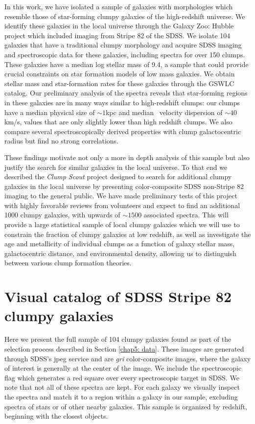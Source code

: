 In this work, we have isolated a sample of galaxies with morphologies which resemble those of star-forming clumpy galaxies of the high-redshift universe. We identify these galaxies in the local universe through the Galaxy Zoo: Hubble project which included imaging from Stripe 82 of the SDSS. We isolate 104 galaxies that have a traditional clumpy morphology and acquire SDSS imaging and spectroscopic data for these galaxies, including spectra for over 150 clumps. These galaxies have a median log stellar mass of 9.4, a sample that could provide crucial constraints on star formation models of low mass galaxies. We obtain stellar mass and star-formation rates for these galaxies through the GSWLC catalog. Our preliminary analysis of the spectra reveals that star-forming regions in these galaxies are in many ways similar to high-redshift clumps: our clumps have a median physical size of $\sim1$kpc and median \ha~velocity dispersion of $\sim40$km/s, values that are only slightly lower than high redshift clumps. We also compare several spectroscopically derived properties with clump galactocentric radius but find no strong correlations. 

These findings motivate not only a more in depth analysis of this sample but also justify the search for similar galaxies in the local universe. To that end we described the \textit{Clump Scout} project designed to search for additional clumpy galaxies in the local universe by presenting color-composite SDSS non-Stripe 82 imaging to the general public. We have made preliminary tests of this project with highly favorable reviews from volunteers and expect to find an additional 1000 clumpy galaxies, with upwards of $\sim1500$ associated spectra. This will provide a large statistical sample of local clumpy galaxies which we will use to constrain the fraction of clumpy galaxies at low redshift, as well as investigate the age and metallicity of individual clumps as a function of galaxy stellar mass, galactocentric distance, and environmental density, allowing us to distinguish between various clump formation theories.  


\section{Visual catalog of SDSS Stripe 82 clumpy galaxies}
\label{chap5: jpegs}

Here we present the full sample of 104 clumpy galaxies found as part of the selection process described in Section \ref{chap5: data}. These images are generated through SDSS's jpeg service and are \textit{gri} color-composite images, where the galaxy of interest is generally at the center of the image. We include the spectroscopic flag which generates a red square over every spectroscopic target in SDSS. We note that not all of these spectra are kept. For each galaxy we visually inspect the spectra and match it to a region within a galaxy in our sample, excluding spectra of stars or of other nearby galaxies. This sample is organized by redshift, beginning with the closest objects. 

